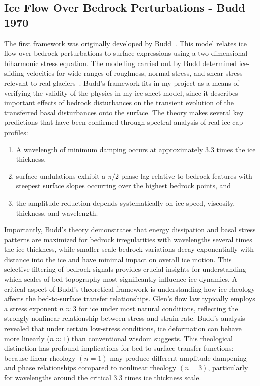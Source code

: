 \subsection{Ice Flow Over Bedrock Perturbations - Budd 1970}
The first framework was originally developed by Budd~\cite{Budd_1970}. This model relates ice flow over bedrock perturbations to surface expressions using a two-dimensional biharmonic stress equation. The modelling carried out by Budd determined ice-sliding velocities for wide ranges of roughness, normal stress, and shear stress relevant to real glaciers~\cite{Budd_1970}. Budd's framework fits in my project as a means of verifying the validity of the physics in my ice-sheet model, since it describes important effects of bedrock disturbances on the transient evolution of the transferred basal disturbances onto the surface. The theory makes several key predictions that have been confirmed through spectral analysis of real ice cap profiles: 
\begin{enumerate}
    \item A wavelength of minimum damping occurs at approximately 3.3 times the ice thickness, 
    \item surface undulations exhibit a $\pi/2$ phase lag relative to bedrock features with steepest surface slopes occurring over the highest bedrock points, and 
    \item the amplitude reduction depends systematically on ice speed, viscosity, thickness, and wavelength. 
\end{enumerate}
Importantly, Budd's theory demonstrates that energy dissipation and basal stress patterns are maximized for bedrock irregularities with wavelengths several times the ice thickness, while smaller-scale bedrock variations decay exponentially with distance into the ice and have minimal impact on overall ice motion. This selective filtering of bedrock signals provides crucial insights for understanding which scales of bed topography most significantly influence ice dynamics.
A critical aspect of Budd's theoretical framework is understanding how ice rheology affects the bed-to-surface transfer relationships. Glen's flow law typically employs a stress exponent $n\approx 3$ for ice under most natural conditions, reflecting the strongly nonlinear relationship between stress and strain rate. Budd's analysis revealed that under certain low-stress conditions, ice deformation can behave more linearly ($n\approx 1$) than conventional wisdom suggests. 
This rheological distinction has profound implications for bed-to-surface transfer functions: because linear rheology $(n = 1)$ may produce different amplitude dampening and phase relationships compared to nonlinear rheology $(n = 3)$, particularly for wavelengths around the critical 3.3 times ice thickness scale.
